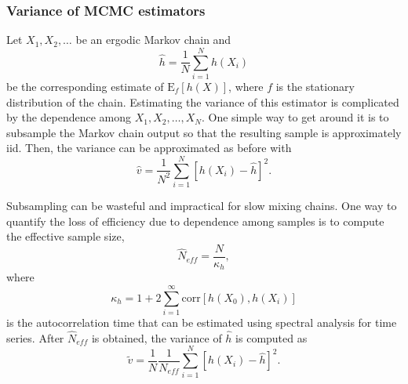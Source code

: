 \documentclass[11pt]{article}\usepackage[]{graphicx}\usepackage[]{color}
\numberwithin{algorithm}{section}
\theoremstyle{remark}
\theoremstyle{definition}
\begin{document}
\subsubsection{Variance of MCMC estimators}
Let $X_1, X_2, \dots$ be an ergodic Markov chain and 
\[
\hat{h} = \frac{1}{N}\sum_{i=1}^N h(X_i)
\]
be the corresponding estimate of $\text{E}_f[h(X)]$, where $f$ is the stationary distribution of the chain. Estimating
the variance of this estimator is complicated by the dependence among $X_1,X_2,\dots,X_N$. One simple way to get
around it is to subsample the Markov chain output so that the resulting sample is approximately iid. Then, the 
variance can be approximated as before with
\[
\hat{v} = \frac{1}{N^2} \sum_{i=1}^N [h(X_i) - \hat{h}]^2.
\]
\par
Subsampling can be wasteful and impractical for slow mixing chains. One way to quantify the loss of efficiency
due to dependence among samples is to compute the effective sample size,
\[
\hat{N}_{eff} = \frac{N}{\kappa_h},
\]
where 
\[
\kappa_h = 1 + 2\sum_{i=1}^{\infty} \text{corr}[h(X_0),h(X_i)]
\]
is the autocorrelation time that can be estimated using spectral analysis for time series. After $\hat{N}_{eff}$
is obtained, the variance of $\hat{h}$ is computed as
\[
\tilde{v} = \frac{1}{N} \frac{1}{N_{eff}}\sum_{i=1}^N [h(X_i) - \hat{h}]^2.
\]
\end{document}
